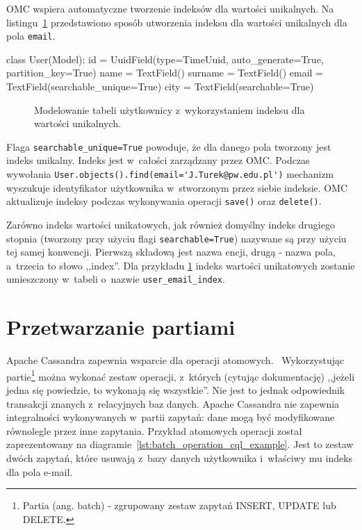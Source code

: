 OMC wspiera automatyczne tworzenie indeksów dla wartości unikalnych. Na listingu~\ref{lst:omc_unique_index_modeling} przedstawiono sposób utworzenia indeksu dla wartości unikalnych dla pola \verb+email+.

\begin{verbbox}[\footnotesize]
class User(Model):
    id = UuidField(type=TimeUuid, auto_generate=True, partition_key=True)
    name = TextField()
    surname = TextField()
    email = TextField(searchable_unique=True)
    city = TextField(searchable=True)
\end{verbbox}

\begin{figure}[ht!]
	\centering
	\theverbbox
	\caption{Modelowanie tabeli użytkownicy z~wykorzystaniem indeksu dla wartości unikalnych.}
	\label{lst:omc_unique_index_modeling}
\end{figure}

Flaga \verb+searchable_unique=True+ powoduje, że dla danego pola tworzony jest indeks unikalny. Indeks jest w~całości zarządzany przez OMC. Podczas wywołania \verb+User.objects().find(email='J.Turek@pw.edu.pl')+ mechanizm wyszukuje identyfikator użytkownika w~stworzonym przez siebie indeksie. OMC aktualizuje indeksy podczas wykonywania operacji \verb+save()+ oraz \verb+delete()+.

Zarówno indeks wartości unikatowych, jak również domyślny indeks drugiego stopnia (tworzony przy użyciu flagi \verb+searchable=True+) nazywane są przy użyciu tej samej konwencji. Pierwszą składową jest nazwa encji, drugą - nazwa pola, a~trzecia to słowo ,,index''. Dla przykładu \ref{lst:omc_unique_index_modeling} indeks wartości unikatowych zostanie umieszczony w~tabeli o~nazwie \verb+user_email_index+.

\section{Przetwarzanie partiami}
\label{sec:batch_processing}

Apache Cassandra zapewnia wsparcie dla operacji atomowych.~\cite{cassandra_batch_operations} Wykorzystując partie\footnote{Partia (ang. batch) - zgrupowany zestaw zapytań INSERT, UPDATE lub DELETE.} można wykonać zestaw operacji, z~których (cytując dokumentację) ,,jeżeli jedna się powiedzie, to wykonają się wszystkie''. Nie jest to jednak odpowiednik transakcji znanych z~relacyjnych baz danych. Apache Cassandra nie zapewnia integralności wykonywanych w~partii zapytań: dane mogą być modyfikowane równolegle przez inne zapytania. Przykład atomowych operacji został zaprezentowany na diagramie~\ref{lst:batch_operation_cql_example}. Jest to zestaw dwóch zapytań, które usuwają z~bazy danych użytkownika i~właściwy mu indeks dla pola e-mail.

